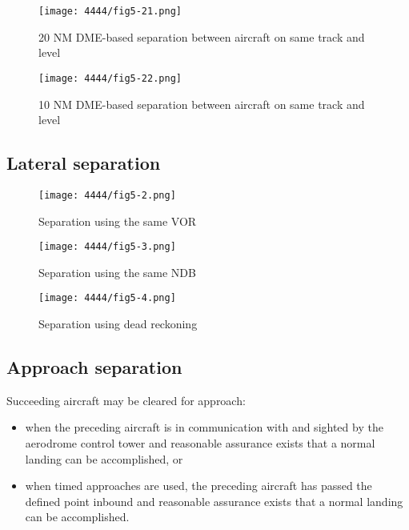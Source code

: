 \begin{figure}[htbp]
  \centering
  \texttt{[image: 4444/fig5-21.png]}
  \caption{20 NM DME-based separation between aircraft on same track and
    level~\cite{4444}}
  \label{fig:separation:long:dme20}
\end{figure}

\begin{figure}[htbp]
  \centering
  \texttt{[image: 4444/fig5-22.png]}
  \caption{10 NM DME-based separation between aircraft on same track and
    level~\cite{4444}}
  \label{fig:separation:long:dme10}
\end{figure}

\clearpage %
\subsection{Lateral separation}

\begin{figure}[htbp]
  \centering
  \texttt{[image: 4444/fig5-2.png]}
  \caption{Separation using the same VOR~\cite{4444}}
  \label{fig:separation:lat:vor}
\end{figure}

\begin{figure}[htbp]
  \centering
  \texttt{[image: 4444/fig5-3.png]}
  \caption{Separation using the same NDB~\cite{4444}}
  \label{fig:separation:lat:ndb}
\end{figure}

\begin{figure}[htbp]
  \centering
  \texttt{[image: 4444/fig5-4.png]}
  \caption{Separation using dead reckoning~\cite{4444}}
  \label{fig:separation:lat:fix}
\end{figure}

\clearpage %
\subsection{Approach separation}

Succeeding aircraft may be cleared for approach:
\begin{itemize}
\item when the preceding aircraft is in communication with and sighted by the
  aerodrome control tower and reasonable assurance exists that a normal landing
  can be accomplished, or
\item when timed approaches are used, the preceding aircraft has passed the
  defined point inbound and reasonable assurance exists that a normal landing
  can be accomplished.
\end{itemize}

